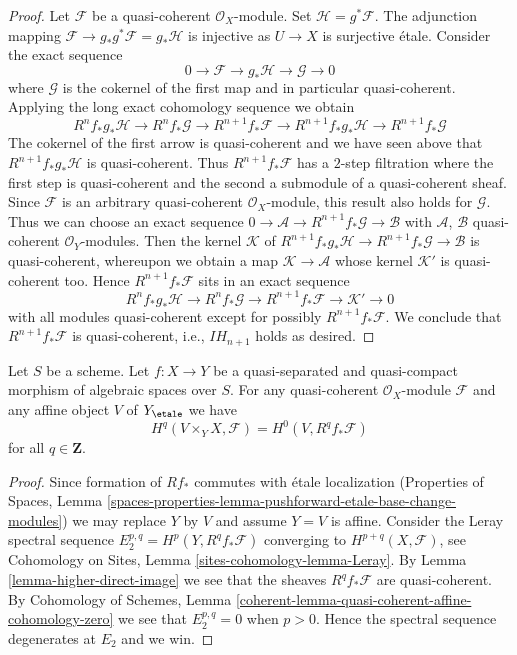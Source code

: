 \begin{proof}
\medskip\noindent
Let $\mathcal{F}$ be a quasi-coherent $\mathcal{O}_X$-module.
Set $\mathcal{H} = g^*\mathcal{F}$. The adjunction mapping
$\mathcal{F} \to g_*g^*\mathcal{F} = g_*\mathcal{H}$ is injective
as $U \to X$ is surjective \'etale. Consider the exact sequence
$$
0 \to \mathcal{F} \to g_*\mathcal{H} \to \mathcal{G} \to 0
$$
where $\mathcal{G}$ is the cokernel of the first map and in particular
quasi-coherent. Applying the long exact cohomology sequence we obtain
$$
R^nf_*g_*\mathcal{H} \to
R^nf_*\mathcal{G} \to
R^{n + 1}f_*\mathcal{F} \to
R^{n + 1}f_*g_*\mathcal{H} \to
R^{n + 1}f_*\mathcal{G}
$$
The cokernel of the first arrow is quasi-coherent and
we have seen above that $R^{n + 1}f_*g_*\mathcal{H}$ is quasi-coherent.
Thus $R^{n + 1}f_*\mathcal{F}$ has a $2$-step filtration
where the first step is quasi-coherent and the second a submodule of
a quasi-coherent sheaf. Since $\mathcal{F}$ is an arbitrary quasi-coherent
$\mathcal{O}_X$-module, this result also holds for $\mathcal{G}$.
Thus we can choose an exact sequence
$0 \to \mathcal{A} \to R^{n + 1}f_*\mathcal{G} \to \mathcal{B}$
with $\mathcal{A}$, $\mathcal{B}$ quasi-coherent $\mathcal{O}_Y$-modules.
Then the kernel $\mathcal{K}$ of
$R^{n + 1}f_*g_*\mathcal{H} \to R^{n + 1}f_*\mathcal{G}
\to \mathcal{B}$ is quasi-coherent, whereupon we obtain a map
$\mathcal{K} \to \mathcal{A}$ whose kernel $\mathcal{K}'$ is
quasi-coherent too. Hence $R^{n + 1}f_*\mathcal{F}$ sits in an exact
sequence
$$
R^nf_*g_*\mathcal{H} \to
R^nf_*\mathcal{G} \to
R^{n + 1}f_*\mathcal{F} \to \mathcal{K}' \to 0
$$
with all modules quasi-coherent except for possibly $R^{n + 1}f_*\mathcal{F}$.
We conclude that $R^{n + 1}f_*\mathcal{F}$ is quasi-coherent, i.e.,
$IH_{n + 1}$ holds as desired.
\end{proof}

\begin{lemma}
\label{lemma-quasi-coherence-higher-direct-images-application}
Let $S$ be a scheme. Let $f : X \to Y$ be a quasi-separated and quasi-compact
morphism of algebraic spaces over $S$. For any quasi-coherent
$\mathcal{O}_X$-module $\mathcal{F}$ and any affine object $V$ of
$Y_\etale$ we have
$$
H^q(V \times_Y X, \mathcal{F}) = H^0(V, R^qf_*\mathcal{F})
$$
for all $q \in \mathbf{Z}$.
\end{lemma}

\begin{proof}
Since formation of $Rf_*$ commutes with \'etale localization
(Properties of Spaces, Lemma
\ref{spaces-properties-lemma-pushforward-etale-base-change-modules})
we may replace $Y$ by $V$ and assume $Y = V$ is affine.
Consider the Leray spectral sequence
$E_2^{p, q} = H^p(Y, R^qf_*\mathcal{F})$
converging to $H^{p + q}(X, \mathcal{F})$, see
Cohomology on Sites, Lemma \ref{sites-cohomology-lemma-Leray}.
By Lemma \ref{lemma-higher-direct-image}
we see that the sheaves $R^qf_*\mathcal{F}$ are quasi-coherent. By
Cohomology of Schemes, Lemma
\ref{coherent-lemma-quasi-coherent-affine-cohomology-zero}
we see that $E_2^{p, q} = 0$ when $p > 0$.
Hence the spectral sequence degenerates at $E_2$ and we win.
\end{proof}




